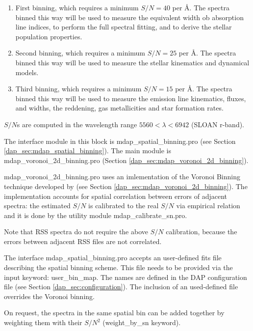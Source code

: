 \documentclass[11pt]{book}
\begin{document}
\begin{enumerate}

\item First binning, which requires a minimum $S/N = 40$ per
  \AA. The spectra binned this way will be used to measure the
  equivalent width ob absorption line indices, to perform the full
  spectral fitting, and to derive the stellar population properties.

\item Second binning, which requires a minimum $S/N = 25$ per
  \AA. The spectra binned this way will be used to measure the
  stellar kinematics and dynamical models.


\item Third binning, which requires a minimum $S/N = 15$ per
  \AA. The spectra binned this way will be used to measure the
  emission line kinematics, fluxes, and widths, the reddening, gas
  metallicities and star formation rates.

\end{enumerate}

$S/N$s are computed in the wavelength range $5560 < \lambda < 6942$
(SLOAN r-band).


The interface module in this block is mdap\_spatial\_binning.pro (see
Section \ref{dap_sec:mdap_spatial_binning}). The main module is
mdap\_voronoi\_2d\_binning.pro (Section
\ref{dap_sec:mdap_voronoi_2d_binning}).

mdap\_voronoi\_2d\_binning.pro uses an imlementation of the Voronoi
Binning technique developed by \citet{Cappellari+03} (see Section
\ref{dap_sec:mdap_voronoi_2d_binning}). The implementation accounts
for spatial correlation between errors of adjacent spectra: the
estimated $S/N$ is calibrated to the real $S/N$ via empirical relation
and it is done by the utility module mdap\_calibrate\_sn.pro.

Note that RSS spectra do not require the above $S/N$ calibration,
because the errors between adjacent RSS files are not correlated.


The interface mdap\_spatial\_binning.pro accepts an user-defined fits
file describing the spatial binning scheme. This file needs to be
provided via the input keyword: user\_bin\_map. The names are defined
in the DAP configuration file (see Section
\ref{dap_sec:configuration}). The inclusion of an used-defined file
overrides the Voronoi binning.

On request, the spectra in the same spatial bin can be added together
by weighting them with their $S/N^2$ (weight\_by\_sn keyword).
\end{document}
